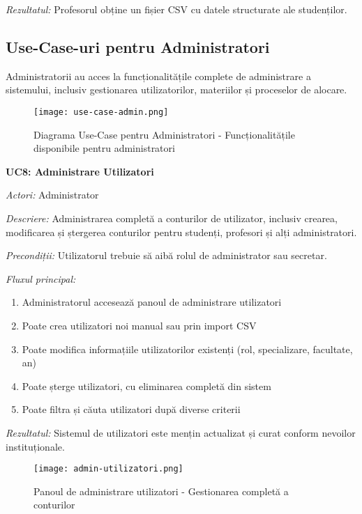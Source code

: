 \documentclass[12pt,a4paper]{report}
\begin{document}
\textit{Rezultatul:} Profesorul obține un fișier CSV cu datele structurate ale studenților.

\subsection{Use-Case-uri pentru Administratori}

Administratorii au acces la funcționalitățile complete de administrare a sistemului, inclusiv gestionarea utilizatorilor, materiilor și proceselor de alocare.

\begin{figure}[H]
\centering
\texttt{[image: use-case-admin.png]}
\caption{Diagrama Use-Case pentru Administratori - Funcționalitățile disponibile pentru administratori}
\label{fig:use-case-admin}
\end{figure}

\textbf{UC8: Administrare Utilizatori}

\textit{Actori:} Administrator

\textit{Descriere:} Administrarea completă a conturilor de utilizator, inclusiv crearea, modificarea și ștergerea conturilor pentru studenți, profesori și alți administratori.

\textit{Precondiții:} Utilizatorul trebuie să aibă rolul de administrator sau secretar.

\textit{Fluxul principal:}
\begin{enumerate}
\item Administratorul accesează panoul de administrare utilizatori
\item Poate crea utilizatori noi manual sau prin import CSV
\item Poate modifica informațiile utilizatorilor existenți (rol, specializare, facultate, an)
\item Poate șterge utilizatori, cu eliminarea completă din sistem
\item Poate filtra și căuta utilizatori după diverse criterii
\end{enumerate}

\textit{Rezultatul:} Sistemul de utilizatori este mențin actualizat și curat conform nevoilor instituționale.

\begin{figure}[H]
\centering
\texttt{[image: admin-utilizatori.png]}
\caption{Panoul de administrare utilizatori - Gestionarea completă a conturilor}
\label{fig:admin-utilizatori}
\end{figure}
\end{document}

